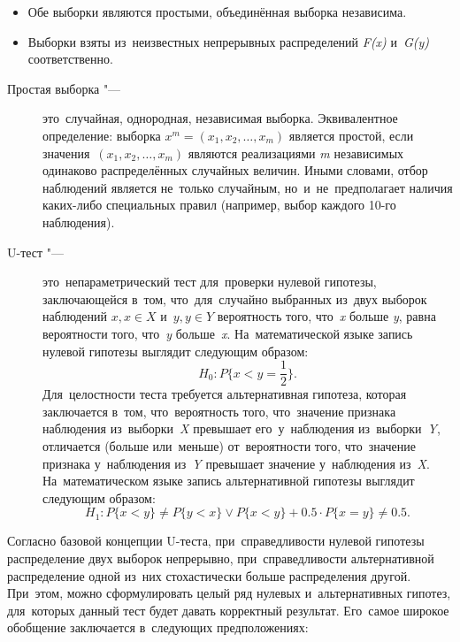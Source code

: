 \documentclass[]{scrartcl}
\begin{document}
\begin{itemize}
	\item Обе выборки являются простыми, объединённая выборка независима.
	\item Выборки взяты из~неизвестных непрерывных распределений \textit{F(x)} и~\textit{G(y)} соответственно.
\end{itemize}
 
\begin{description}
	\item[Простая выборка "---] это~случайная, однородная, независимая выборка. Эквивалентное определение: выборка ${\textstyle x^{m} = (x_{1},x_{2},\ldots,x_{m})}$ является простой, если значения~${\textstyle (x_{1},x_{2},\ldots,x_{m})}$ являются реализациями \textit{m} независимых одинаково распределённых случайных величин. Иными словами, отбор наблюдений является не~только случайным, но~и~не~предполагает наличия каких-либо специальных правил (например, выбор каждого 10-го наблюдения).
\end{description}
\begin{description}
	\item[U-тест "---] это~непараметрический тест для~проверки нулевой гипотезы, заключающейся в~том, что~для~случайно выбранных из~двух выборок наблюдений ${\textstyle x, x \in X}$ и~${\textstyle y, y \in Y}$ вероятность того, что~\textit{x} больше \textit{y}, равна вероятности того, что~\textit{y} больше~\textit{x}. На~математической языке запись нулевой гипотезы выглядит следующим образом:
	\begin{equation}\label{eq:U-test-null-hypothesis}
	H_{0}:P\{x<y=\frac{1}{2}\}.
	\end{equation}
	Для~целостности теста требуется альтернативная гипотеза, которая заключается в~том, что~вероятность того, что~значение признака наблюдения из~выборки~\textit{X} превышает его~у~наблюдения из~выборки~\textit{Y}, отличается (больше или~меньше) от~вероятности того, что~значение признака у~наблюдения из~\textit{Y} превышает значение у~наблюдения из~\textit{X}. На~математическом языке запись альтернативной гипотезы выглядит следующим образом:
	\begin{equation}\label{eq:U-test-alt-hypothesis}
	H_{1}:P\{x<y\} \neq P\{y<x\} \vee P\{x<y\} + 0.5 \cdot P\{x=y\} \neq 0.5.
	\end{equation}
\end{description}
Согласно базовой концепции U-теста, при~справедливости нулевой гипотезы распределение двух выборок непрерывно, при~справедливости альтернативной распределение одной из~них стохастически больше распределения другой. При~этом, можно сформулировать целый ряд нулевых и~альтернативных гипотез, для~которых данный тест будет давать корректный результат. Его~самое широкое обобщение заключается в~следующих предположениях:
\end{document}
